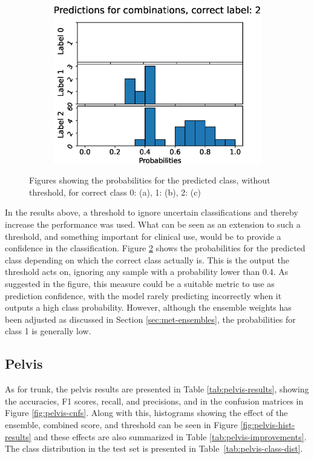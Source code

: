 \begin{figure}
\begin{subfigure}[t]{0.33\textwidth}
    \includegraphics[width=\textwidth]{files/figs/res/trunk/pc2.eps}
    \caption{}
    \label{fig:trunk-pc2}
  \end{subfigure}

  \caption{Figures showing the probabilities for the predicted class, without threshold, for correct class 0: (a), 1: (b), 2: (c)}
  \label{fig:trunk-pc}
\end{figure}

In the results above, a threshold to ignore uncertain classifications and thereby increase the performance was used. What can be seen as an extension to such a threshold, and something important for clinical use, would be to provide a confidence in the classification. Figure \ref{fig:trunk-pc} shows the probabilities for the predicted class depending on which the correct class actually is. This is the output the threshold acts on, ignoring any sample with a probability lower than 0.4. As suggested in the figure, this measure could be a suitable metric to use as prediction confidence, with the model rarely predicting incorrectly when it outputs a high class probability. However, although the ensemble weights has been adjusted as discussed in Section \ref{sec:met-ensembles}, the probabilities for class 1 is generally low.

\FloatBarrier
\subsection{Pelvis}
As for trunk, the pelvis results are presented in Table \ref{tab:pelvis-results}, showing the accuracies, F1 scores, recall, and precisions, and in the confusion matrices in Figure \ref{fig:pelvis-cnfs}.
Along with this, histograms showing the effect of the ensemble, combined score, and threshold can be seen in Figure \ref{fig:pelvis-hist-results} and these effects are also summarized in Table \ref{tab:pelvis-improvements}. The class distribution in the test set is presented in Table~\ref{tab:pelvis-class-dist}.

